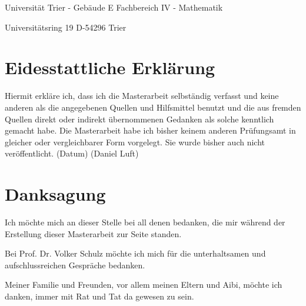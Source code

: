 \documentclass[bibliography=totoc,12pt,a4paper]{scrartcl}
\theoremstyle{exampstyle}
\numberwithin{equation}{section}
\begin{document}
\vspace{10cm}
Universität Trier - Gebäude E \newline
Fachbereich IV - Mathematik

Universitätsring 19 \newline
D-54296 Trier

\section*{Eidesstattliche Erklärung}
Hiermit erkläre ich, dass ich die Masterarbeit selbständig verfasst und keine anderen als die angegebenen Quellen und Hilfsmittel benutzt und die aus fremden Quellen direkt oder indirekt übernommenen
Gedanken als solche kenntlich gemacht habe. Die Masterarbeit habe ich bisher keinem anderen Prüfungsamt in gleicher oder vergleichbarer Form vorgelegt. Sie wurde bisher auch nicht veröffentlicht.
\vspace{1.5cm}
\newline
(Datum) \hspace{9cm} (Daniel Luft)



\newpage




\section*{Danksagung}

Ich möchte mich an dieser Stelle bei all denen bedanken, die mir während der Erstellung dieser Masterarbeit zur Seite standen. 
\newline

Bei Prof. Dr. Volker Schulz möchte ich mich für die unterhaltsamen und aufschlussreichen Gespräche bedanken. 
\newline 

Meiner Familie und Freunden, vor allem meinen Eltern und Aibi, möchte ich danken, immer mit Rat und Tat da gewesen zu sein.

\newpage

  \tableofcontents

\newpage

  \pagestyle{headings}
  
\end{document}
